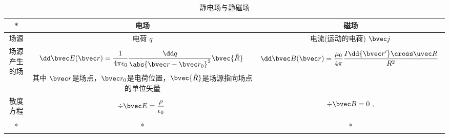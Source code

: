 
\begin{issues}
\issueDraft
\end{issues}

\begin{table}[ht]
\centering
\caption{静电场与静磁场}\label{tab_estfid1}
\begin{tabular}{|c|c|c|}
\hline
* & 电场 & 磁场 \\
\hline
场源 & 电荷 $q$ & 电流(运动的电荷) $\bvec j$ \\
\hline
场源产生的场 & $$\dd \bvec E (\bvec r) = \frac{1}{4 \pi \epsilon_0} \frac{\dd q}{\abs{\bvec r - \bvec r_0}^2} \bvec {\hat R}~ $$
其中 $\bvec r$是场点，$\bvec r_0$是电荷位置，$\bvec {\hat R}$是场源指向场点的单位矢量 
& $$\dd \bvec B(\bvec r) = \frac{\mu_0}{4\pi} \frac{I \dd{\bvec r'} \cross \uvec R}{R^2}~$$ \\

\hline
散度方程 & $$\div \bvec E = \frac{\rho}{\epsilon_0}~$$ & $$\div \bvec B = 0~,$$ \\
\hline
* & * & * \\
\hline
\end{tabular}
\end{table}
